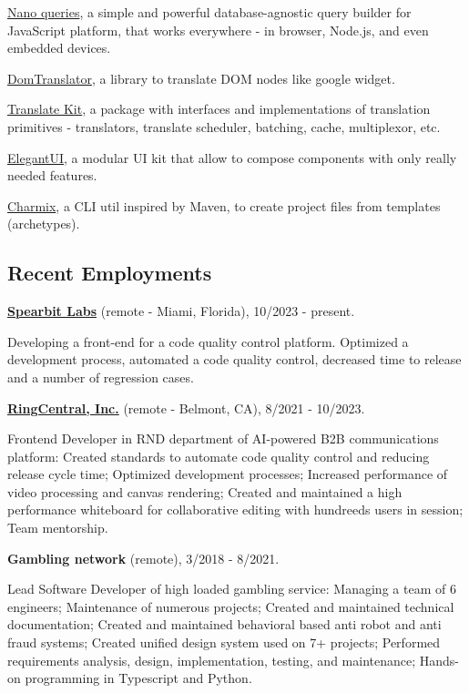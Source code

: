 \documentclass{vitonsky}
\begin{document}
\href{https://github.com/vitonsky/nano-queries}{Nano queries}, a simple and powerful database-agnostic query builder for JavaScript platform, that works everywhere - in browser, Node.js, and even embedded devices.

\href{https://github.com/translate-tools/domtranslator}{DomTranslator}, a library to translate DOM nodes like google widget.

\href{https://github.com/translate-tools/core}{Translate Kit}, a package with interfaces and implementations of translation primitives - translators, translate scheduler, batching, cache, multiplexor, etc.

\href{https://github.com/vitonsky/react-elegant-ui}{ElegantUI}, a
modular UI kit that allow to compose components with only really needed features.

\href{https://github.com/vitonsky/charmix}{Charmix}, a CLI util inspired
by Maven, to create project files from templates (archetypes).

\subsection*{Recent Employments}

\textbf{\href{https://spearbit.com/}{Spearbit Labs}} (remote -  Miami, Florida), 10/2023 - present.

Developing a front-end for a code quality control platform. Optimized a development process, automated a code quality control, decreased time to release and a number of regression cases.

\textbf{\href{https://www.ringcentral.com/}{RingCentral, Inc.}} (remote - Belmont, CA), 8/2021 - 10/2023.

Frontend Developer in RND department of AI-powered B2B communications platform: Created standards to automate code quality control and reducing release cycle time; Optimized development processes; Increased performance of video processing and canvas rendering; Created and maintained a high performance whiteboard for collaborative editing with hundreeds users in session; Team mentorship.

\textbf{Gambling network} (remote), 3/2018 - 8/2021.

Lead Software Developer of high loaded gambling service: Managing a team of 6 engineers; Maintenance of numerous projects; Created and maintained technical documentation; Created and maintained behavioral based anti robot and anti fraud systems; Created unified design system used on 7+ projects; Performed requirements analysis, design, implementation, testing, and maintenance; Hands-on programming in Typescript and Python.
\end{document}
